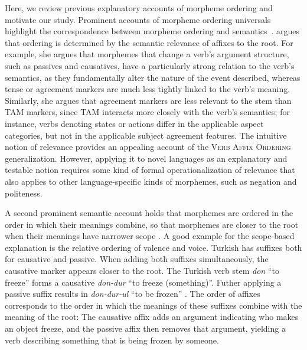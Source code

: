 \documentclass[11pt,letterpaper]{article}
\newcommand{\citep}{\parencite}
\newcommand{\citet}{\Textcite}
\newcommand\becky[1]{{\color{blue}(#1)}}
\begin{document}
Here, we review previous explanatory accounts of morpheme ordering and motivate our study.
Prominent accounts of morpheme ordering universals highlight the correspondence between morpheme ordering and semantics~\citep{bybee-morphology-1985,rice2000morpheme}.
\citet{bybee-morphology-1985} argues that ordering is determined by the semantic relevance of affixes to the root.
For example, she argues that morphemes that change a verb's argument structure, such as passives and causatives, have a particularly strong relation to the verb's semantics, as they fundamentally alter the nature of the event described, whereas tense or agreement markers are much less tightly linked to the verb's meaning.
Similarly, she argues that agreement markers are less relevant to the stem than TAM markers, since TAM interacts more closely with the verb's semantics; for instance, verbs denoting states or actions differ in the applicable aspect categories, but not in the applicable subject agreement features.
The intuitive notion of relevance provides an appealing account of the \textsc{Verb Affix Ordering} generalization.
However, applying it to novel languages as an explanatory and testable notion requires some kind of formal operationalization of relevance that also applies to other language-specific kinds of morphemes, such as negation and politeness.

A second prominent semantic account holds that morphemes are ordered in the order in which their meanings combine, so that morphemes are closer to the root when their meanings have narrower scope \citep[e.g.,][]{rice2000morpheme, caballero2010scope,  narrog2010the, korotkova2010deriving}.
A good example for the scope-based explanation is the relative ordering of valence and voice.
Turkish has suffixes both for causative and passive.
When adding both suffixes simultaneously, the causative marker appears closer to the root.
The Turkish verb stem \textit{don} ``to freeze'' forms a causative \textit{don-dur} ``to freeze (something)''.
Futher applying a passive suffix results in \textit{don-dur-ul} ``to be frozen'' \citep[][Section 30.8.2]{schaaik2020turkish}.
The order of affixes corresponds to the order in which the meanings of these suffixes combine with the meaning of the root:
The causative affix adds an argument indicating who makes an object freeze, and the passive affix then removes that argument, yielding a verb describing something that is being frozen by someone.
\end{document}
